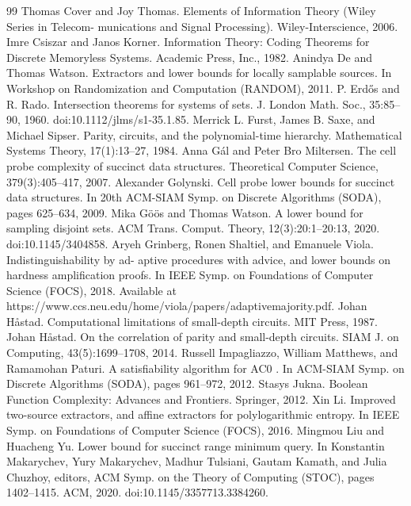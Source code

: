 \documentclass[10pt,a4paper]{article}
\begin{document}
\begin{thebibliography}{99}
 Thomas Cover and Joy Thomas. Elements of Information Theory (Wiley Series in Telecom- munications and Signal Processing). Wiley-Interscience, 2006.
 Imre Csiszar and Janos Korner. Information Theory: Coding Theorems for Discrete Memoryless Systems. Academic Press, Inc., 1982.
 Anindya De and Thomas Watson. Extractors and lower bounds for locally samplable sources. In Workshop on Randomization and Computation (RANDOM), 2011.
 P. Erdős and R. Rado. Intersection theorems for systems of sets. J. London Math. Soc., 35:85–90, 1960. doi:10.1112/jlms/s1-35.1.85.
 Merrick L. Furst, James B. Saxe, and Michael Sipser. Parity, circuits, and the polynomial-time hierarchy. Mathematical Systems Theory, 17(1):13–27, 1984.
 Anna Gál and Peter Bro Miltersen. The cell probe complexity of succinct data structures. Theoretical Computer Science, 379(3):405–417, 2007.
 Alexander Golynski. Cell probe lower bounds for succinct data structures. In 20th ACM-SIAM Symp. on Discrete Algorithms (SODA), pages 625–634, 2009.
 Mika Göös and Thomas Watson. A lower bound for sampling disjoint sets. ACM Trans. Comput. Theory, 12(3):20:1–20:13, 2020. doi:10.1145/3404858.
 Aryeh Grinberg, Ronen Shaltiel, and Emanuele Viola.               Indistinguishability by ad- aptive procedures with advice, and lower bounds on hardness amplification proofs. In IEEE Symp. on Foundations of Computer Science (FOCS), 2018.                    Available at https://www.ccs.neu.edu/home/viola/papers/adaptivemajority.pdf.
 Johan Håstad. Computational limitations of small-depth circuits. MIT Press, 1987.
 Johan Håstad. On the correlation of parity and small-depth circuits. SIAM J. on Computing, 43(5):1699–1708, 2014.
 Russell Impagliazzo, William Matthews, and Ramamohan Paturi. A satisfiability algorithm for AC0 . In ACM-SIAM Symp. on Discrete Algorithms (SODA), pages 961–972, 2012.
 Stasys Jukna. Boolean Function Complexity: Advances and Frontiers. Springer, 2012.
 Xin Li. Improved two-source extractors, and affine extractors for polylogarithmic entropy. In IEEE Symp. on Foundations of Computer Science (FOCS), 2016.
 Mingmou Liu and Huacheng Yu. Lower bound for succinct range minimum query. In Konstantin Makarychev, Yury Makarychev, Madhur Tulsiani, Gautam Kamath, and Julia Chuzhoy, editors, ACM Symp. on the Theory of Computing (STOC), pages 1402–1415. ACM, 2020. doi:10.1145/3357713.3384260.

\end{thebibliography}
\end{document}
